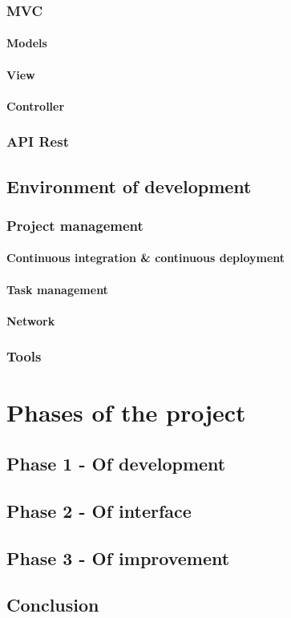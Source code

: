 \documentclass[a4paper, 12pt, openany]{book}
\begin{document}
\section{MVC}
\subsection{Models}
\subsection{View}
\subsection{Controller}
\section{API Rest}
\chapter{Environment of development}
\section{Project management}
\subsection{Continuous integration \& continuous deployment}
\subsection{Task management}
\subsection{Network}
\section{Tools}
\part{Phases of the project}
\chapter{Phase 1 - Of development}
\chapter{Phase 2 - Of interface}
\chapter{Phase 3 - Of improvement}
\backmatter
\chapter{Conclusion}
\end{document}

